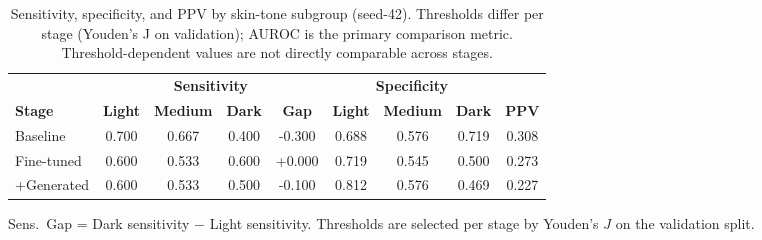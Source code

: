\begin{table}[htbp]
\centering
\footnotesize
\setlength{\tabcolsep}{4pt}
\caption{Sensitivity, specificity, and PPV by skin-tone subgroup (seed-42). Thresholds differ per stage (Youden's J on validation); AUROC is the primary comparison metric. Threshold-dependent values are not directly comparable across stages.}
\label{tab:sensitivity}
\begin{tabular}{lcccccccc}
\toprule
 & \multicolumn{4}{c}{\textbf{Sensitivity}} & \multicolumn{3}{c}{\textbf{Specificity}} & \\
\cmidrule(lr){2-5}\cmidrule(lr){6-8}
\textbf{Stage} & \textbf{Light} & \textbf{Medium} & \textbf{Dark} & \textbf{Gap} & \textbf{Light} & \textbf{Medium} & \textbf{Dark} & \textbf{PPV} \\
\midrule
Baseline & 0.700 & 0.667 & 0.400 & -0.300 & 0.688 & 0.576 & 0.719 & 0.308 \\
Fine-tuned & 0.600 & 0.533 & 0.600 & +0.000 & 0.719 & 0.545 & 0.500 & 0.273 \\
+Generated & 0.600 & 0.533 & 0.500 & -0.100 & 0.812 & 0.576 & 0.469 & 0.227 \\
\bottomrule
\end{tabular}
\vspace{2pt}
\footnotesize{Sens.\ Gap = Dark sensitivity $-$ Light sensitivity. Thresholds are selected per stage by Youden's $J$ on the validation split.}
\end{table}
